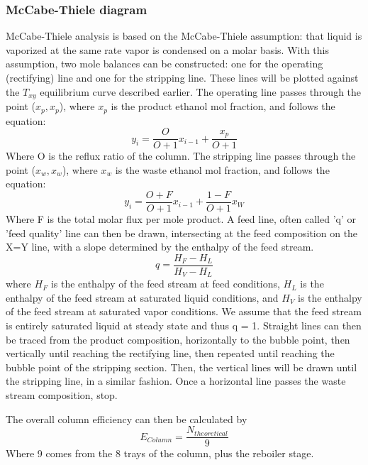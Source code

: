\documentclass[lettersize,journal]{IEEEtran}
\begin{document}
	\subsubsection{McCabe-Thiele diagram}
	McCabe-Thiele analysis is based on the McCabe-Thiele assumption: that liquid is vaporized at the same rate vapor is condensed on a molar basis. With this assumption, two mole balances can be constructed: one for the operating (rectifying) line and one for the stripping line. These lines will be plotted against the $T_{xy}$ equilibrium curve described earlier. The operating line passes through the point ($x_{p},x_{p}$), where $x_{p}$ is the product ethanol mol fraction, and follows the equation:
	\begin{equation}
		\label{deqn_ex5.5}
		y_{i} = \frac{O}{O+1}x_{i-1} + \frac{x_{p}}{O+1}
	\end{equation}
	Where O is the reflux ratio of the column. The stripping line passes through the point ($x_{w},x_{w}$), where $x_{w}$ is the waste ethanol mol fraction, and follows the equation:
	\begin{equation}
		\label{deqn_ex5.5}
		y_{i} = \frac{O+F}{O+1}x_{i-1} + \frac{1-F}{O+1}x_{W}
	\end{equation}
	Where F is the total molar flux per mole product.
	A feed line, often called 'q' or 'feed quality' line can then be drawn, intersecting at the feed composition on the X=Y line, with a slope determined by the enthalpy of the feed stream. 
	\begin{equation}
		\label{deqn_ex5.5}
		q = \frac{H_{F} - H_{L}}{H_{V} - H_{L}}
	\end{equation}
	where $H_{F}$ is the enthalpy of the feed stream at feed conditions, $H_{L}$ is the enthalpy of the feed stream at saturated liquid conditions, and $H_{V}$ is the enthalpy of the feed stream at saturated vapor conditions. We assume that the feed stream is entirely saturated liquid at steady state and thus q = 1.
	Straight lines can then be traced from the product composition, horizontally to the bubble point, then vertically until reaching the rectifying line, then repeated until reaching the bubble point of the stripping section. Then, the vertical lines will be drawn until the stripping line, in a similar fashion. Once a horizontal line passes the waste stream composition, stop.
	
	
	The overall column efficiency can then be calculated by
	\begin{equation}
		\label{deqn_ex5.5}
		E_{Column} = \frac{N_{theoretical}}{9}
	\end{equation}
	Where 9 comes from the 8 trays of the column, plus the reboiler stage.
	
\end{document}
